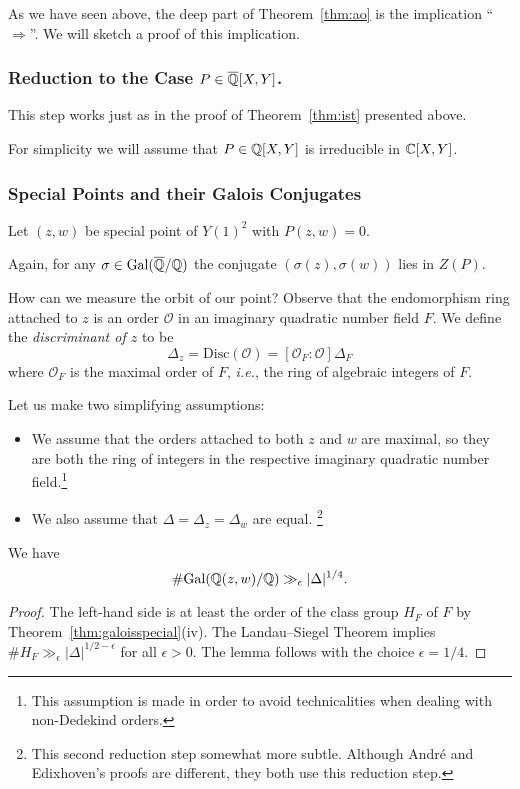 As we have seen above, the deep part of Theorem~\ref{thm:ao} is the
implication
``$\Longrightarrow$''. We will sketch a proof of this implication. 

\subsubsection{Reduction to the Case $P \in {\overline{\mathbb{Q}}}[X,Y]$.}
This step works just as in the proof of Theorem~\ref{thm:ist}
presented above.

For simplicity we will assume that $P \in{\mathbb{Q}}[X,Y]$ is irreducible
in ${\mathbb{C}}[X,Y]$. 

\subsubsection{Special Points and their Galois Conjugates}

Let $(z,w)$ be special point of $Y(1)^2$ with $P(z,w)=0$.

Again, for any $\sigma\in \mathrm{Gal}({\overline{\mathbb{Q}}}/{\mathbb{Q}})$ the conjugate
$(\sigma(z),\sigma(w))$ lies in $Z(P)$.

How can we measure the orbit of our point? Observe that the
endomorphism ring attached to $z$ is an order $\mathcal{O}$ in an imaginary
quadratic number field $F$. We define the \emph{discriminant of $z$}
to be 
\begin{equation*}
  \Delta_z = \mathrm{Disc}(\mathcal{O}) = [\mathcal{O}_F:\mathcal{O}] \Delta_F
\end{equation*}
where $\mathcal{O}_F$ is the maximal order of $F$, \textit{i.e.}, the
ring of algebraic integers of $F$. 

Let us make two simplifying assumptions:
\begin{itemize}
\item We assume that the orders attached to 
  both $z$ and $w$ are maximal, so they are both the ring of integers in
  the respective imaginary quadratic number field.\footnote{This assumption is made in
    order to avoid technicalities when dealing with non-Dedekind
    orders.}
\item We also assume that 
  $\Delta =
  \Delta_z=\Delta_w$ are equal.  \footnote{This second reduction step
    somewhat more subtle.
    Although Andr\'e and Edixhoven's proofs are different, they both use
    this reduction step.}
\end{itemize}

\begin{lemma}
  \label{lem:lgocm}
  We have
  \begin{equation*}
    \# \mathrm{Gal}({\mathbb{Q}}(z,w)/{\mathbb{Q}}) \gg_\epsilon
    |\Delta|^{1/4}. 
  \end{equation*}
\end{lemma}
\begin{proof}
  The left-hand side is at least the order of the class group $H_F$ of $F$ by
  Theorem~\ref{thm:galoisspecial}(iv). The Landau--Siegel Theorem
  implies $\# H_F \gg_\epsilon |\Delta|^{1/2-\epsilon}$ for all $\epsilon>0$. 
  The lemma follows with the choice $\epsilon =1/4$. 
\end{proof}

